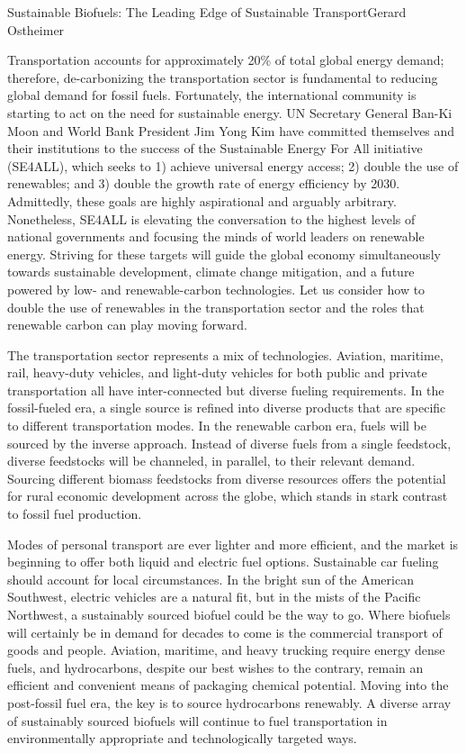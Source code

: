 \documentclass{papertex}
\begin{document}
\begin{news}{2}{Sustainable Biofuels: The Leading Edge of Sustainable 
    Transport}{Gerard Ostheimer}{}{}

Transportation accounts for approximately 20\% of total global energy demand; 
therefore, de-carbonizing the transportation sector is fundamental to reducing 
global demand for fossil fuels. Fortunately, the international community is 
starting to act on the need for sustainable energy. UN Secretary General 
Ban-Ki Moon and World Bank President Jim Yong Kim have committed themselves 
and their institutions to the success of the Sustainable Energy For All 
initiative (SE4ALL), which seeks to 1) achieve universal energy access; 2) 
double the use of renewables; and 3) double the growth rate of energy 
efficiency by 2030. Admittedly, these goals are highly aspirational and 
arguably arbitrary. Nonetheless, SE4ALL is elevating the conversation to the 
highest levels of national governments and focusing the minds of world leaders 
on renewable energy. Striving for these targets will guide the global economy 
simultaneously towards sustainable development, climate change mitigation, and 
a future powered by low- and renewable-carbon technologies. Let us consider 
how to double the use of renewables in the transportation sector and the roles 
that renewable carbon can play moving forward.

The transportation sector represents a mix of technologies. Aviation, 
maritime, rail, heavy-duty vehicles, and light-duty vehicles for both public 
and private transportation all have inter-connected but diverse fueling 
requirements. In the fossil-fueled era, a single source is refined into 
diverse products that are specific to different transportation modes. In the 
renewable carbon era, fuels will be sourced by the inverse approach. Instead 
of diverse fuels from a single feedstock, diverse feedstocks will be 
channeled, in parallel, to their relevant demand. Sourcing different biomass 
feedstocks from diverse resources offers the potential for rural economic 
development across the globe, which stands in stark contrast to fossil fuel 
production.

Modes of personal transport are ever lighter and more efficient, and the 
market is beginning to offer both liquid and electric fuel options. 
Sustainable car fueling should account for local circumstances. In the bright 
sun of the American Southwest, electric vehicles are a natural fit, but in the 
mists of the Pacific Northwest, a sustainably sourced biofuel could be the way 
to go. Where biofuels will certainly be in demand for decades to come is the 
commercial transport of goods and people. Aviation, maritime, and heavy 
trucking require energy dense fuels, and hydrocarbons, despite our best wishes 
to the contrary, remain an efficient and convenient means of packaging chemical 
potential. Moving into the post-fossil fuel era, the key is to source 
hydrocarbons renewably. A diverse array of sustainably sourced biofuels will 
continue to fuel transportation in environmentally appropriate and 
technologically targeted ways.


\end{news}
\end{document}
